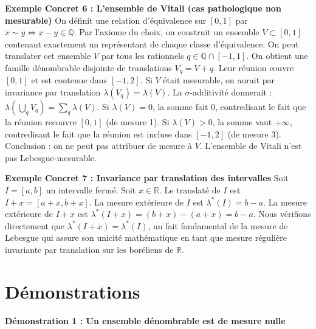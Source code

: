 \documentclass[11pt,a4paper]{article}
\begin{document}
\textbf{Exemple Concret 6 : L'ensemble de Vitali (cas pathologique non mesurable)}
On définit une relation d'équivalence sur $[0, 1]$ par $x \sim y \iff x - y \in \mathbb{Q}$.
Par l'axiome du choix, on construit un ensemble $V \subset [0, 1]$ contenant exactement un représentant de chaque classe d'équivalence.
On peut translater cet ensemble $V$ par tous les rationnels $q \in \mathbb{Q} \cap [-1, 1]$. On obtient une famille dénombrable disjointe de translations $V_q = V + q$.
Leur réunion couvre $[0, 1]$ et est contenue dans $[-1, 2]$.
Si $V$ était mesurable, on aurait par invariance par translation $\lambda(V_q) = \lambda(V)$.
La $\sigma$-additivité donnerait : $\lambda\left(\bigcup_q V_q\right) = \sum_q \lambda(V)$.
Si $\lambda(V) = 0$, la somme fait $0$, contredisant le fait que la réunion recouvre $[0, 1]$ (de mesure 1).
Si $\lambda(V) > 0$, la somme vaut $+\infty$, contredisant le fait que la réunion est incluse dans $[-1, 2]$ (de mesure 3).
Conclusion : on ne peut pas attribuer de mesure à $V$. L'ensemble de Vitali n'est pas Lebesgue-mesurable.

\textbf{Exemple Concret 7 : Invariance par translation des intervalles}
Soit $I = [a, b]$ un intervalle fermé.
Soit $x \in \mathbb{R}$. Le translaté de $I$ est $I + x = [a+x, b+x]$.
La mesure extérieure de $I$ est $\lambda^*(I) = b - a$.
La mesure extérieure de $I+x$ est $\lambda^*(I+x) = (b+x) - (a+x) = b - a$.
Nous vérifions directement que $\lambda^*(I+x) = \lambda^*(I)$, un fait fondamental de la mesure de Lebesgue qui assure son unicité mathématique en tant que mesure régulière invariante par translation sur les boréliens de $\mathbb{R}$.

\section{Démonstrations}

\textbf{Démonstration 1 : Un ensemble dénombrable est de mesure nulle}
\end{document}
